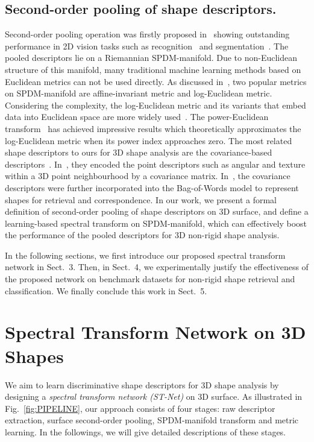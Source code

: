 \documentclass[runningheads]{llncs}
\begin{document}
\subsection{Second-order pooling of shape descriptors.}  
Second-order pooling operation was firstly proposed in~\cite{Carreira} showing outstanding performance in 2D vision tasks such as recognition~\cite{Catalin1} and segmentation~\cite{Carreira}. The pooled descriptors lie on a Riemannian SPDM-manifold. Due to  non-Euclidean structure of this manifold, many traditional machine learning methods based on Euclidean metrics can not be used directly. As discussed in~\cite{Vincent,Xavier}, two popular metrics on SPDM-manifold are affine-invariant metric and log-Euclidean metric. Considering the complexity, the log-Euclidean metric and its variants \cite{Catalin2,huang2016a} that embed data into Euclidean space are more widely used~\cite{Carreira,Hedi}.
The power-Euclidean transform~\cite{dryden2009non-euclidean} has achieved impressive results which theoretically approximates the log-Euclidean metric when its power index approaches zero.
The most related shape descriptors to ours for 3D shape analysis are the covariance-based descriptors~\cite{covariance1,Hedi}. In~\cite{covariance1}, they encoded the point descriptors such as angular and texture within a 3D point neighbourhood by a covariance matrix. In~\cite{Hedi}, the covariance descriptors were further incorporated into the Bag-of-Words model to represent shapes for retrieval and correspondence. In our work, we present a formal definition of second-order pooling of shape descriptors on 3D surface, and define a learning-based spectral transform on SPDM-manifold, which can effectively boost the  performance of the pooled descriptors for 3D non-rigid shape analysis. 


In the following sections, we first introduce our proposed spectral transform network in Sect.~3. Then, in Sect.~4, we experimentally justify the effectiveness of the proposed network on benchmark datasets for non-rigid shape retrieval and classification. We finally conclude this work in Sect.~5.


\section{Spectral Transform Network on 3D Shapes }
We aim to learn discriminative shape descriptors for 3D shape analysis by designing a \emph{spectral transform network (ST-Net)} on 3D surface.  As illustrated in Fig.~\ref{fig:PIPELINE}, our approach consists of four stages: raw descriptor extraction, surface second-order pooling, SPDM-manifold transform and metric learning. In the followings, we will give detailed descriptions of these stages.
\end{document}
